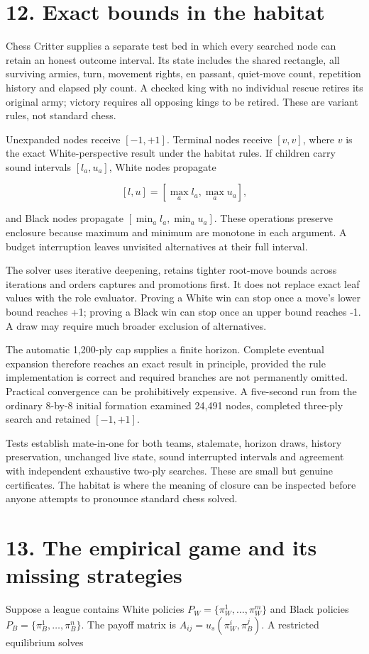\documentclass[10pt]{article}
\begin{document}
\clearpage
\section*{12. Exact bounds in the habitat}
Chess Critter supplies a separate test bed in which every searched node can retain an honest outcome interval. Its state includes the shared rectangle, all surviving armies, turn, movement rights, en passant, quiet-move count, repetition history and elapsed ply count. A checked king with no individual rescue retires its original army; victory requires all opposing kings to be retired. These are variant rules, not standard chess.

Unexpanded nodes receive $[-1,+1]$. Terminal nodes receive $[v,v]$, where $v$ is the exact White-perspective result under the habitat rules. If children carry sound intervals $[l_a,u_a]$, White nodes propagate

\[
[l,u]=[\max_a l_a,\max_a u_a],
\]

and Black nodes propagate $[\min_a l_a,\min_a u_a]$. These operations preserve enclosure because maximum and minimum are monotone in each argument. A budget interruption leaves unvisited alternatives at their full interval.

The solver uses iterative deepening, retains tighter root-move bounds across iterations and orders captures and promotions first. It does not replace exact leaf values with the role evaluator. Proving a White win can stop once a move's lower bound reaches +1; proving a Black win can stop once an upper bound reaches -1. A draw may require much broader exclusion of alternatives.

The automatic 1,200-ply cap supplies a finite horizon. Complete eventual expansion therefore reaches an exact result in principle, provided the rule implementation is correct and required branches are not permanently omitted. Practical convergence can be prohibitively expensive. A five-second run from the ordinary 8-by-8 initial formation examined 24,491 nodes, completed three-ply search and retained $[-1,+1]$.

Tests establish mate-in-one for both teams, stalemate, horizon draws, history preservation, unchanged live state, sound interrupted intervals and agreement with independent exhaustive two-ply searches. These are small but genuine certificates. The habitat is where the meaning of closure can be inspected before anyone attempts to pronounce standard chess solved.

\clearpage
\section*{13. The empirical game and its missing strategies}
Suppose a league contains White policies $P_W=\{\pi_W^1,\ldots,\pi_W^m\}$ and Black policies $P_B=\{\pi_B^1,\ldots,\pi_B^n\}$. The payoff matrix is $A_{ij}=u_s(\pi_W^i,\pi_B^j)$. A restricted equilibrium solves
\end{document}
